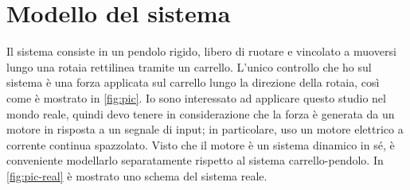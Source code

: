\section{Modello del sistema}
Il sistema consiste in un pendolo rigido, libero di ruotare e vincolato a muoversi lungo una rotaia rettilinea tramite un carrello.
L'unico controllo che ho sul sistema è
una forza applicata sul carrello lungo la direzione della rotaia,
così come è mostrato in \autoref{fig:pic}.
Io sono interessato
ad applicare questo studio nel mondo reale, quindi devo tenere
in considerazione che la forza è generata da un motore in risposta
a un segnale di input; in particolare, uso un motore elettrico a corrente continua
spazzolato. Visto che il motore è un sistema dinamico in sé,
è conveniente modellarlo separatamente rispetto al sistema
carrello-pendolo.
In \autoref{fig:pic-real} è
mostrato uno schema del sistema reale.

